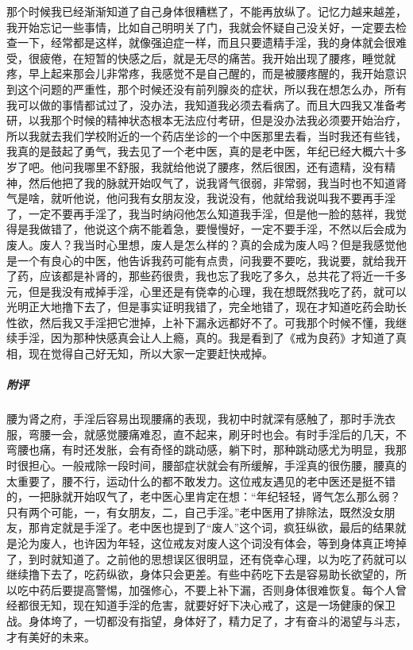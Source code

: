 \begin{case}
    那个时候我已经渐渐知道了自己身体很糟糕了，不能再放纵了。记忆力越来越差，我开始忘记一些事情，比如自己明明关了门，我就会怀疑自己没关好，一定要去检查一下，经常都是这样，就像强迫症一样，而且只要遗精手淫，我的身体就会很难受，很疲倦，在短暂的快感之后，就是无尽的痛苦。我开始出现了腰疼，睡觉就疼，早上起来那会儿非常疼，我感觉不是自己醒的，而是被腰疼醒的，我开始意识到这个问题的严重性，那个时候还没有前列腺炎的症状，所以我在想怎么办，所有我可以做的事情都试过了，没办法，我知道我必须去看病了。而且大四我又准备考研，以我那个时候的精神状态根本无法应付考研，但是没办法我必须要开始治疗，所以我就去我们学校附近的一个药店坐诊的一个中医那里去看，当时我还有些钱，我真的是鼓起了勇气，我去见了一个老中医，真的是老中医，年纪已经大概六十多岁了吧。他问我哪里不舒服，我就给他说了腰疼，然后很困，还有遗精，没有精神，然后他把了我的脉就开始叹气了，说我肾气很弱，非常弱，我当时也不知道肾气是啥，就听他说，他问我有女朋友没，我说没有，他就给我说叫我不要再手淫了，一定不要再手淫了，我当时纳闷他怎么知道我手淫，但是他一脸的慈祥，我觉得是我做错了，他说这个病不能着急，要慢慢好，一定不要手淫，不然以后会成为废人。废人？我当时心里想，废人是怎么样的？真的会成为废人吗？但是我感觉他是一个有良心的中医，他告诉我药可能有点贵，问我要不要吃，我说要，就给我开了药，应该都是补肾的，那些药很贵，我也忘了我吃了多久，总共花了将近一千多元，但是我没有戒掉手淫，心里还是有侥幸的心理，我在想既然我吃了药，就可以光明正大地撸下去了，但是事实证明我错了，完全地错了，现在才知道吃药会助长性欲，然后我又手淫把它泄掉，上补下漏永远都好不了。可我那个时候不懂，我继续手淫，因为那种快感真会让人上瘾，真的。我是看到了《戒为良药》才知道了真相，现在觉得自己好无知，所以大家一定要赶快戒掉。
    \subparagraph{附评} 腰为肾之府，手淫后容易出现腰痛的表现，我初中时就深有感触了，那时手洗衣服，弯腰一会，就感觉腰痛难忍，直不起来，刷牙时也会。有时手淫后的几天，不弯腰也痛，有时还发胀，会有奇怪的跳动感，躺下时，那种跳动感尤为明显，我那时很担心。一般戒除一段时间，腰部症状就会有所缓解，手淫真的很伤腰，腰真的太重要了，腰不行，运动什么的都不敢发力。这位戒友遇见的老中医还是挺不错的，一把脉就开始叹气了，老中医心里肯定在想：“年纪轻轻，肾气怎么那么弱？只有两个可能，一，有女朋友，二，自己手淫。”老中医用了排除法，既然没女朋友，那肯定就是手淫了。老中医也提到了“废人”这个词，疯狂纵欲，最后的结果就是沦为废人，也许因为年轻，这位戒友对废人这个词没有体会，等到身体真正垮掉了，到时就知道了。之前他的思想误区很明显，还有侥幸心理，以为吃了药就可以继续撸下去了，吃药纵欲，身体只会更差。有些中药吃下去是容易助长欲望的，所以吃中药后要提高警惕，加强修心，不要上补下漏，否则身体很难恢复。每个人曾经都很无知，现在知道手淫的危害，就要好好下决心戒了，这是一场健康的保卫战。身体垮了，一切都没有指望，身体好了，精力足了，才有奋斗的渴望与斗志，才有美好的未来。
\end{case}

